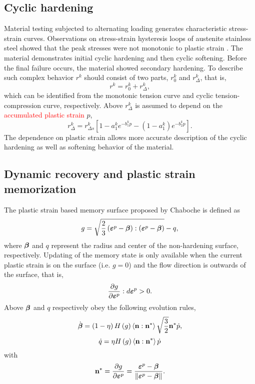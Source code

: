 \documentclass[preprint,5p,twocolumn,11pt,sort&compress]{elsarticle}
\newcommand{\bfepsilon}{{\mbox{\boldmath{$\varepsilon$}}}}
\newcommand{\bfbeta}{{\mbox{\boldmath{$\beta$}}}}
\newcommand{\bfn}{{\bf n}}
\newcommand{\marked}[1]{\textcolor{red}{#1}}
\begin{document}
\subsection{Cyclic hardening}
Material testing subjected to alternating loading generates characteristic stress-strain curves. Observations on stress-strain hysteresis loops of austenite stainless steel showed that the peak stresses were not monotonic to plastic strain \cite{fang2015cyclic}. The material demonstrates initial cyclic hardening and then cyclic softening. Before the final failure occurs, the material showed secondary hardening. To describe such complex behavior $r^k$ should consist of two parts, $r_0^k$ and $r_{\Delta}^k$, that is,
\begin{equation}
\label{Equ:rk1}
{r^k} = r_0^k + r_\Delta ^k,
\end{equation}
which can be identified from the monotonic tension curve and cyclic tension-compression curve, respectively.
Above $r_\Delta ^k$ is assumed to depend on the \marked{accumulated plastic strain} $p$,
\begin{equation}
\label{Equ:rdeltak1}
r_\Delta ^k = r_{\Delta s}^k\left[ {1 - a_1^k{e^{ - b_1^kp}} - (1-a_1^k){e^{ - b_2^kp}} }\right].
\label{Equ:rdeltak}
\end{equation}
The dependence on plastic strain allows more accurate description of the cyclic hardening as well as softening behavior of the material.

\subsection{Dynamic recovery and plastic strain memorization}
The plastic strain based memory surface proposed by Chaboche \cite{Chaboche1986149} is defined as
\begin{equation}
\label{Equ:g1}
g = \sqrt {\frac{2}{3}\left( {{\bfepsilon^p} - \bfbeta} \right):\left( {{\bfepsilon^p} - \bfbeta} \right)}  - q,
\end{equation}
where $\bfbeta$ and $q$ represent the radius and center of the non-hardening surface, respectively.
Updating of the memory state is only available when the current plastic strain is on the surface (i.e. $g=0$) and the flow direction is outwards of the surface, that is,
\[
\frac{{\partial g}}{{\partial {\bfepsilon^p}}}:d{\bfepsilon^p} > 0.
\]
Above $\bfbeta$ and $q$ respectively obey the following evolution rules,
\begin{equation}
\label{Equ:dotbeta1}
\dot\bfbeta  = \left( {1 - \eta } \right)H\left( g \right)\left\langle {\bfn:{\bfn^*}} \right\rangle \sqrt {\frac{3}{2}} {\bfn^*}\dot p,
\end{equation}
\begin{equation}
\label{Equ:dotq1}
\dot q = \eta H\left( g \right)\left\langle {\bfn:{\bfn^*}} \right\rangle \dot p
\end{equation}
with
\begin{equation}
\label{Equ:nstar}
{\bfn^*} = \frac{{\partial g}}{{\partial {\bfepsilon^p}}} = \frac{{{\bfepsilon^p} - \bfbeta}}{{\left\| {{\bfepsilon^p} - \bfbeta} \right\|}}.
\end{equation}
\end{document}
